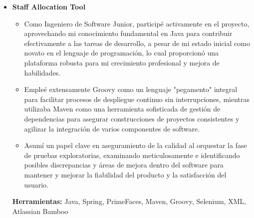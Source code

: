 \documentclass[11pt,a4paper,english]{moderncv}
\begin{document}
{\begin{itemize}
\begin{itemize}
            \item Me encargaron el desarrollo de componentes críticos para la misión, específicamente utilizando Interfaces de Zope para mejorar la modularidad y reutilización a través de la arquitectura de software, asegurando así que la escalabilidad y mantenibilidad del sistema cumplieran con los estrictos requisitos del alcance de nuestro proyecto.
            \item Mis responsabilidades también incluyeron la realización de sesiones de capacitación exhaustivas centradas en metodologías de pruebas unitarias, de integración y de extremo a extremo utilizando bibliotecas de pruebas de Python avanzadas, elevando significativamente la competencia del equipo en la entrega de código de alta calidad y libre de errores en alineación con las mejores prácticas de la industria.
        \end{itemize}
        \textbf{Herramientas:} Python, Zope, Atlassian Bamboo
    \item \textbf{Staff Allocation Tool}
        \begin{itemize}
            \item Como Ingeniero de Software Junior, participé activamente en el proyecto, aprovechando mi conocimiento fundamental en Java para contribuir efectivamente a las tareas de desarrollo, a pesar de mi estado inicial como novato en el lenguaje de programación, lo cual proporcionó una plataforma robusta para mi crecimiento profesional y mejora de habilidades.
            \item Empleé extensamente Groovy como un lenguaje "pegamento" integral para facilitar procesos de despliegue continuo sin interrupciones, mientras utilizaba Maven como una herramienta sofisticada de gestión de dependencias para asegurar construcciones de proyectos consistentes y agilizar la integración de varios componentes de software.
            \item Asumí un papel clave en aseguramiento de la calidad al orquestar la fase de pruebas exploratorias, examinando meticulosamente e identificando posibles discrepancias y áreas de mejora dentro del software para mantener y mejorar la fiabilidad del producto y la satisfacción del usuario.
        \end{itemize}
        \textbf{Herramientas:} Java, Spring, PrimeFaces, Maven, Groovy, Selenium, XML, Atlassian Bamboo
\end{itemize}
}

\subsection{}
\end{document}

